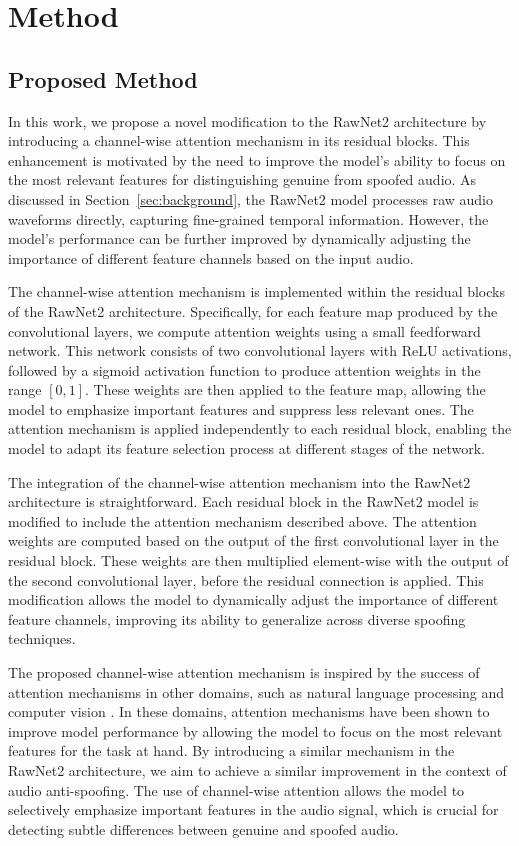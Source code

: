 \documentclass{article} %
\begin{document}
\section{Method}
\label{sec:method}
\subsection{Proposed Method}
In this work, we propose a novel modification to the RawNet2 architecture by introducing a channel-wise attention mechanism in its residual blocks. This enhancement is motivated by the need to improve the model's ability to focus on the most relevant features for distinguishing genuine from spoofed audio. As discussed in Section~\ref{sec:background}, the RawNet2 model processes raw audio waveforms directly, capturing fine-grained temporal information. However, the model's performance can be further improved by dynamically adjusting the importance of different feature channels based on the input audio.

The channel-wise attention mechanism is implemented within the residual blocks of the RawNet2 architecture. Specifically, for each feature map produced by the convolutional layers, we compute attention weights using a small feedforward network. This network consists of two convolutional layers with ReLU activations, followed by a sigmoid activation function to produce attention weights in the range $[0, 1]$. These weights are then applied to the feature map, allowing the model to emphasize important features and suppress less relevant ones. The attention mechanism is applied independently to each residual block, enabling the model to adapt its feature selection process at different stages of the network.

The integration of the channel-wise attention mechanism into the RawNet2 architecture is straightforward. Each residual block in the RawNet2 model is modified to include the attention mechanism described above. The attention weights are computed based on the output of the first convolutional layer in the residual block. These weights are then multiplied element-wise with the output of the second convolutional layer, before the residual connection is applied. This modification allows the model to dynamically adjust the importance of different feature channels, improving its ability to generalize across diverse spoofing techniques.

The proposed channel-wise attention mechanism is inspired by the success of attention mechanisms in other domains, such as natural language processing and computer vision \citep{vaswani2017attention}. In these domains, attention mechanisms have been shown to improve model performance by allowing the model to focus on the most relevant features for the task at hand. By introducing a similar mechanism in the RawNet2 architecture, we aim to achieve a similar improvement in the context of audio anti-spoofing. The use of channel-wise attention allows the model to selectively emphasize important features in the audio signal, which is crucial for detecting subtle differences between genuine and spoofed audio.
\end{document}
